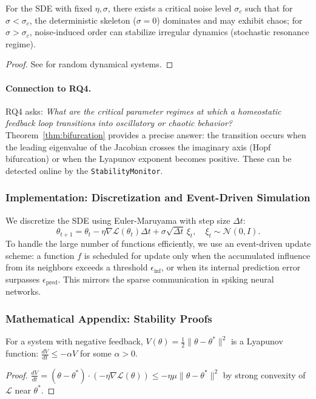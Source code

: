 \begin{theorem}
For the SDE with fixed $\eta, \sigma$, there exists a critical noise level $\sigma_c$ such that for $\sigma < \sigma_c$, the deterministic skeleton ($\sigma=0$) dominates and may exhibit chaos; for $\sigma > \sigma_c$, noise-induced order can stabilize irregular dynamics (stochastic resonance regime).
\end{theorem}
\begin{proof}
See \cite{arnold1998random} for random dynamical systems.
\end{proof}

\paragraph{Connection to RQ4.}
RQ4 asks: \emph{What are the critical parameter regimes at which a homeostatic feedback loop transitions into oscillatory or chaotic behavior?} Theorem~\ref{thm:bifurcation} provides a precise answer: the transition occurs when the leading eigenvalue of the Jacobian crosses the imaginary axis (Hopf bifurcation) or when the Lyapunov exponent becomes positive. These can be detected online by the \texttt{StabilityMonitor}.

\subsubsection{Implementation: Discretization and Event-Driven Simulation}
We discretize the SDE using Euler-Maruyama with step size $\Delta t$:
\[
\theta_{t+1} = \theta_t - \eta \nabla \mathcal{L}(\theta_t) \Delta t + \sigma \sqrt{\Delta t} \, \xi_t, \quad \xi_t \sim \mathcal{N}(0, I).
\]
To handle the large number of functions efficiently, we use an event-driven update scheme: a function $f$ is scheduled for update only when the accumulated influence from its neighbors exceeds a threshold $\epsilon_{\text{inf}}$, or when its internal prediction error surpasses $\epsilon_{\text{pred}}$. This mirrors the sparse communication in spiking neural networks.

\subsubsection{Mathematical Appendix: Stability Proofs}
\begin{lemma}
For a system with negative feedback, $V(\theta) = \frac{1}{2}\|\theta - \theta^*\|^2$ is a Lyapunov function: $\frac{dV}{dt} \le -\alpha V$ for some $\alpha > 0$.
\end{lemma}
\begin{proof}
$\frac{dV}{dt} = (\theta - \theta^*) \cdot (-\eta \nabla \mathcal{L}(\theta)) \le -\eta \mu \|\theta - \theta^*\|^2$ by strong convexity of $\mathcal{L}$ near $\theta^*$.
\end{proof}

